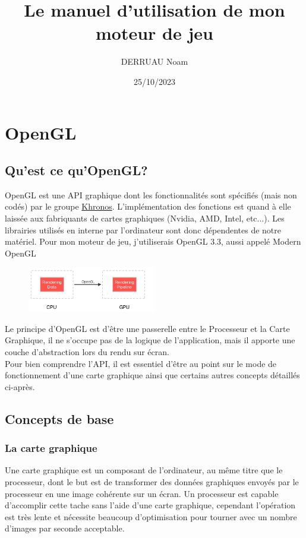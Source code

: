 \documentclass[a4paper,10pt]{article}
\title{Le manuel d'utilisation de mon moteur de jeu}
\author{DERRUAU Noam}
\date{25/10/2023}
\begin{document}
\maketitle

\newpage
\tableofcontents
\newpage

\section{OpenGL}

\subsection{Qu'est ce qu'OpenGL?}

OpenGL est une API graphique dont les fonctionnalités sont spécifiés (mais non codés) par le groupe \href{https://www.khronos.org/}{Khronos}. L'implémentation des fonctions est quand à elle laissée aux fabriquants de cartes graphiques (Nvidia, AMD, Intel, etc...). Les librairies utilisés en interne par l'ordinateur sont donc dépendentes de notre matériel.
Pour mon moteur de jeu, j'utiliserais OpenGL 3.3, aussi appelé Modern OpenGL
\\
\begin{figure}
    \centering
    \includegraphics[width=0.5\textwidth]{OpenGL_purpose}
\end{figure}

Le principe d'OpenGL est d'être une passerelle entre le Processeur et la Carte Graphique, il ne s'occupe pas de la logique de l'application, mais il apporte une couche d'abstraction lors du rendu sur écran.
\\
Pour bien comprendre l'API, il est essentiel d'être au point sur le mode de fonctionnement d'une carte graphique ainsi que certains autres concepts détaillés ci-après.

\subsection{Concepts de base}
\subsubsection{La carte graphique}
Une carte graphique est un composant de l'ordinateur, au même titre que le processeur, dont le but est de transformer des données graphiques envoyés par le processeur en une image cohérente sur un écran. Un processeur est capable d'accomplir cette tache sans l'aide d'une carte graphique, cependant l'opération est très lente et nécessite beaucoup d'optimisation pour tourner avec un nombre d'images par seconde acceptable.
\end{document}
